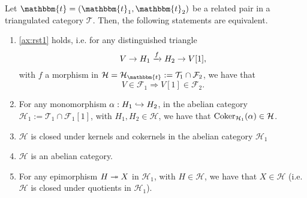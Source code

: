 \begin{thm}\label{thm:2.9}
  Let $\mathbbm{t}=(\mathbbm{t}_1,\mathbbm{t}_2)$ be a related pair in a triangulated
  category $\mathcal{T}$. Then, the following statements are equivalent.
  \begin{enumerate}[label=(\alph*)]
    \item \ref{ax:rst1} holds, i.e. for any distinguished triangle \[V\to H_1\xrightarrow{f}H_2\to V[1],\] with
      $f$ a morphism in $\mathcal{H}=\mathcal{H}_\mathbbm{t}:=\mathcal{T}_1\cap\mathcal{F}_2$,
      we have that
      \begin{equation*}
        V\in\mathcal{F}_1 \Rightarrow V[1]\in\mathcal{F}_2.
      \end{equation*}
    \item For any monomorphism $\alpha:H_1\hookrightarrow H_2$, in the abelian category
      $\mathcal{H}_1:=\mathcal{T}_1\cap\mathcal{F}_1[1]$, with $H_1,H_2\in\mathcal{H}$,
      we have that $\operatorname{Coker}_{\mathcal{H}_1}(\alpha)\in\mathcal{H}$.
    \item $\mathcal{H}$ is closed under kernels and cokernels in the abelian category
      $\mathcal{H}_1$
    \item $\mathcal{H}$ is an abelian category.
    \item For any epimorphism $H\twoheadrightarrow X$ in $\mathcal{H}_1$, with $H\in\mathcal{H}$,
      we have that $X\in\mathcal{H}$ (i.e. $\mathcal{H}$ is closed under quotients in $\mathcal{H}_1$).
  \end{enumerate}
\end{thm}

